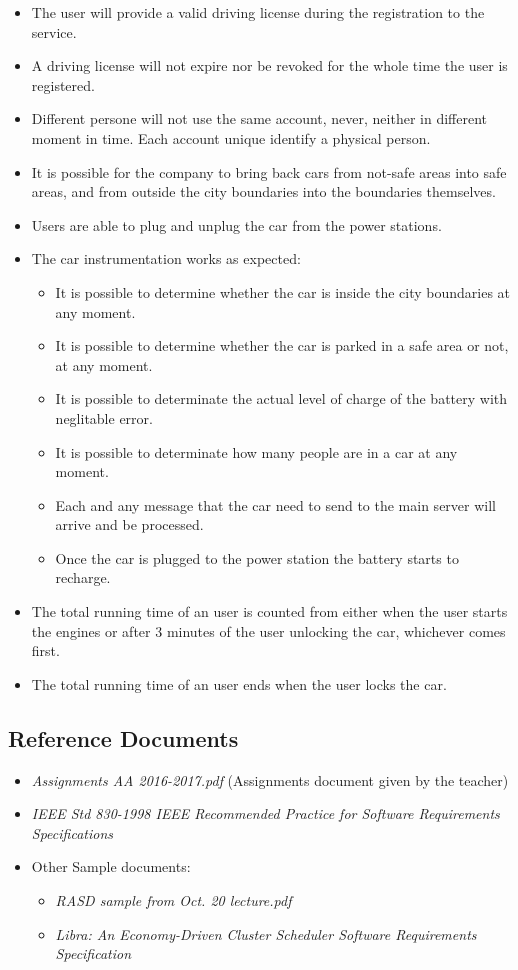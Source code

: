 \documentclass[11pt]{article} %
\begin{document}
\begin{itemize}
	\item The user will provide a valid driving license during the registration to the service.
	\item A driving license will not expire nor be revoked for the whole time the user is registered.
	\item Different persone will not use the same account, never, neither in different moment in time. Each account unique identify a physical person.
	\item It is possible for the company to bring back cars from not-safe areas into safe areas, and from outside the city boundaries into the boundaries themselves.
	\item Users are able to plug and unplug the car from the power stations.
	\item The car instrumentation works as expected:
	\begin{itemize}
		\item It is possible to determine whether the car is inside the city boundaries at any moment.
		\item It is possible to determine whether the car is parked in a safe area or not, at any moment.
		\item It is possible to determinate the actual level of charge of the battery with neglitable error.
		\item It is possible to determinate how many people are in a car at any moment.
		\item Each and any message that the car need to send to the main server will arrive and be processed.
		\item Once the car is plugged to the power station the battery starts to recharge.
	\end{itemize}
	\item The total running time of an user is counted from either when the user starts the engines or after 3 minutes of the user unlocking the car, whichever comes first.
	\item The total running time of an user ends when the user locks the car.
\end{itemize}

\subsection{Reference Documents}
\begin{itemize}
	\item \textit{Assignments AA 2016-2017.pdf} (Assignments document given by the teacher)
	\item \textit{IEEE Std 830-1998 IEEE Recommended Practice for Software Requirements Specifications}
	\item Other Sample documents:
		\begin{itemize}
			\item \textit{RASD sample from Oct. 20 lecture.pdf}
			\item \textit{Libra: An Economy-Driven Cluster Scheduler Software Requirements Specification}
		\end{itemize}
  \end{itemize}
\end{document}
